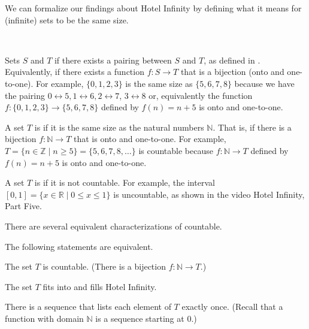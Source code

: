 We can formalize our findings about Hotel Infinity by defining what it means for (infinite) sets to be the same size.

\begin{defn}
\label{defn_countable}
~
    \begin{apart}
        \item Sets $S$ and $T$  if there exists a pairing between $S$ and $T$, as defined in . Equivalently, if there exists a function $f:S \to T$ that is a bijection (onto and one-to-one).  For example, $\{0,1,2,3\}$ is the same size as $\{5,6,7,8\}$ because we have the pairing $0 \leftrightarrow 5, 1 \leftrightarrow 6, 2 \leftrightarrow 7$, $3 \leftrightarrow 8$ or, equivalently the function $f:\{0,1,2,3\} \to \{5,6,7,8\}$ defined by $f(n)=n+5$ is onto and one-to-one.
        \item A set $T$  is  if it is the same size as the natural numbers $\mathbb{N}$.  That is, if there is a bijection $f:\mathbb{N} \to T$ that is onto and one-to-one. For example, $T = \{n \in \mathbb{Z} \mid n \ge 5\} = \{5,6,7,8, \ldots\}$ is countable because $f:\mathbb{N} \to T$ defined by $f(n)=n+5$ is onto and one-to-one.
        \item A set $T$ is  if it is not countable.  For example, the interval $[0,1] = \{x \in \mathbb{R} \mid 0 \le x \le 1\}$ is uncountable, as shown in the video Hotel Infinity, Part Five.
    \end{apart}
\end{defn}

There are several equivalent characterizations of countable.

\begin{rem}
\label{rem_alt_defn_countable}
    The following statements are equivalent.
        \begin{apart}
            \item The set $T$ is countable. (There is a bijection $f: \mathbb{N} \to T$.)
            \item The set $T$ fits into and fills Hotel Infinity.
            \item \label{part_seq_countable} There is a sequence that lists each element of $T$ exactly once. (Recall that a function with domain $\mathbb{N}$ is a sequence starting at 0.)
        \end{apart}
\end{rem}

